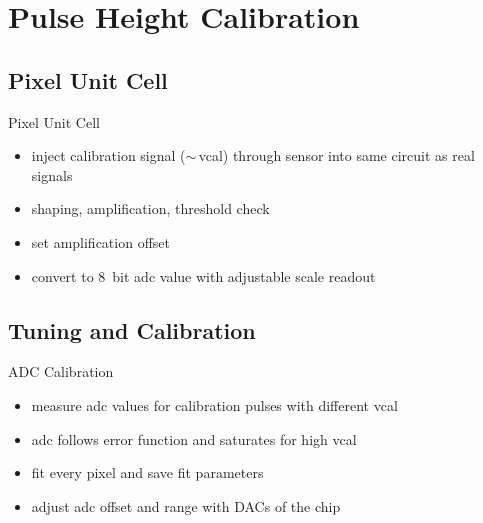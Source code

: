 \section{Pulse Height Calibration}
\subsection{Pixel Unit Cell}
\begin{frame}{Pixel Unit Cell}

	
	\begin{itemize}\itemfill
		\item inject calibration signal ($\sim$\,vcal) through sensor into same circuit as real signals
		\item shaping, amplification, threshold check
		\item set amplification offset
		\item convert to \SI{8}{bit} adc value with adjustable scale \ra readout
	\end{itemize}
	
\end{frame}

\subsection{Tuning and Calibration}
\begin{frame}{ADC Calibration}
	
	
	\vspace*{-10pt}

	\begin{itemize}\itemfill 
		\item measure adc values for calibration pulses with different vcal
		\item adc follows error function and saturates for high vcal
		\item fit every pixel and save fit parameters
		\item adjust adc offset and range with DACs of the chip
	\end{itemize}

\end{frame}

